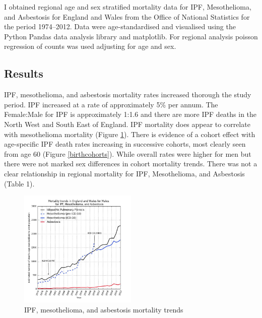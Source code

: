 \documentclass[
]{article}
\begin{document}
I obtained regional age and sex stratified mortality data for IPF,
Mesothelioma, and Asbestosis for England and Wales from the Office of
National Statistics for the period 1974--2012. Data were
age-standardised and visualised using the Python Pandas data analysis
library and matplotlib. For regional analysis poisson regression of
counts was used adjusting for age and sex.

\hypertarget{results-1}{%
\subsection{Results}\label{results-1}}

IPF, mesothelioma, and asbestosis mortality rates increased thorough the
study period. IPF increased at a rate of approximately 5\% per annum.
The Female:Male for IPF is approximately 1:1.6 and there are more IPF
deaths in the North West and South East of England. IPF mortality does
appear to correlate with mesothelioma mortality (Figure
\ref{mortalitytrends}). There is evidence of a cohort effect with
age-specific IPF death rates increasing in successive cohorts, most
clearly seen from age 60 (Figure \ref{birthcohorts}). While overall
rates were higher for men but there were not marked sex differences in
cohort mortality trends. There was not a clear relationship in regional
mortality for IPF, Mesothelioma, and Asbestosis (Table 1).

\begin{figure}
\centering
\includegraphics[width=0.5\textwidth,height=\textheight]{source/figures/ipfasbmesomaletrend.jpg}
\caption{IPF, mesothelioma, and asbestosis mortality trends
\label{mortalitytrends}}
\end{figure}
\end{document}
